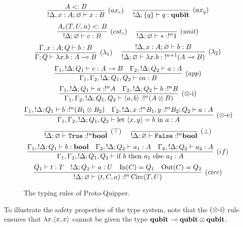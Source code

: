 \documentclass[twoside]{article}
\begin{document}

\begin{figure}[!ht]
\begin{mdframed}
\[
\infer[(ax_c)]{!\Delta, x:A;\varnothing\entails x:B}{
  A<:B
}
~~~~
\infer[(ax_q)]{!\Delta;\s{q}\entails q:\qubit}{
} 
\]
\[
\infer[(cst_c)]{!\Delta;\varnothing \entails c:B}{
  A_{c}(T,U,n)<:B
} 
~~~~
\infer[(unit)]{!\Delta;\varnothing\entails *:!^n 1}{
}
\]
\[
\infer[(\lambda_1)]{\Gamma;Q\entails \lambda x.b:A\loli B}{
  \Gamma,x:A;Q \entails b:B
}
~~~~
\infer[(\lambda_2)]{!\Delta;\varnothing \entails \lambda x.b:~!^{n+1}(A\loli B)}{
  !\Delta, x:A;\varnothing \entails b:B
}
\]
\[
\infer[(app)]{\Gamma_1,\Gamma_2, !\Delta;Q_1,Q_2\entails ca:B}{
  \Gamma_1, !\Delta;Q_1\entails c:A\loli B 
  &
  \Gamma_2, !\Delta ;Q_2\entails a:A 
}
\]
\[
\infer[(\x\mbox{-i})]{\Gamma_1,\Gamma_2, !\Delta;Q_1,Q_2\entails \p{a,b}:!^n(A\x B)}{
  \Gamma_1, !\Delta;Q_1\entails a:!^nA 
  &
  \Gamma_2, !\Delta ;Q_2\entails b:!^nB
}
\]
\[
\infer[(\x\mbox{-e})]{\Gamma_1,\Gamma_2, !\Delta;Q_1,Q_2\entails \letin{\p{x,y}}{b}{a}:A}{
  \Gamma_1, !\Delta;Q_1\entails b:!^n(B_1\x B_2) 
  &
  \Gamma_2, !\Delta, x:!^nB_1, y:!^nB_2 ;Q_2\entails a:A
}
\]
\[
\infer[(\top)]{!\Delta;\varnothing\entails \true:!^n \bool}{
} 
~~~~
\infer[(\bot)]{!\Delta;\varnothing\entails \false:!^n \bool}{
}
\]
\[
\infer[(if)]{\Gamma_1,\Gamma_2, !\Delta;Q_1,Q_2\entails \ifthenelse{b}{a_1}{a_2}:A}{
  \Gamma_1, !\Delta;Q_1\entails b:\bool 
  &
  \Gamma_2, !\Delta;Q_2 \entails a_1:A ~~~ \Gamma_2, !\Delta;Q_2 \entails a_2:A
}
\]
\[
\infer[(circ)]{!\Delta;\varnothing \entails (t,C,a):!^n\Circ(T,U)}{
  Q_1\entails t:T 
  &
  !\Delta ; Q_2\entails a:U 
  &
  \In(C)=Q_1 
  &
  \Out(C)=Q_2
}
\]
\end{mdframed}
\caption{The typing rules of Proto-Quipper.}
\label{trules}
\end{figure}

To illustrate the safety properties of the type system, 
note that the $(\otimes\mbox{-i})$ rule ensures that 
$\lambda x. \langle x,x\rangle$ cannot be given the type 
$\textrm{\bf qubit}\multimap \textrm{\bf qubit} \otimes \textrm{\bf qubit}$.
\end{document}
